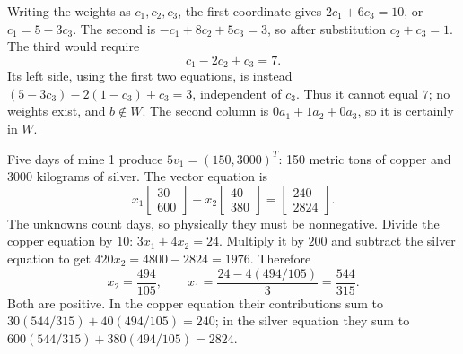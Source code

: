 Writing the weights as $c_1,c_2,c_3$, the first coordinate gives
$2c_1+6c_3=10$, or $c_1=5-3c_3$.
The second is $-c_1+8c_2+5c_3=3$, so after substitution
$c_2+c_3=1$. The third would require
\[
c_1-2c_2+c_3=7.
\]
Its left side, using the first two equations, is instead
$(5-3c_3)-2(1-c_3)+c_3=3$, independent of $c_3$.
Thus it cannot equal $7$; no weights exist, and $b\notin W$.
The second column is $0a_1+1a_2+0a_3$, so it is certainly in $W$.

Five days of mine 1 produce $5v_1=(150,3000)^T$: 150 metric tons
of copper and 3000 kilograms of silver.
The vector equation is
\[
x_1\begin{bmatrix}30\\600\end{bmatrix}
+x_2\begin{bmatrix}40\\380\end{bmatrix}
=\begin{bmatrix}240\\2824\end{bmatrix}.
\]
The unknowns count days, so physically they must be nonnegative.
Divide the copper equation by $10$: $3x_1+4x_2=24$.
Multiply it by $200$ and subtract the silver equation to get
$420x_2=4800-2824=1976$. Therefore
\[
x_2=\frac{494}{105},\qquad
x_1=\frac{24-4(494/105)}3=\frac{544}{315}.
\]
Both are positive. In the copper equation their contributions sum to
$30(544/315)+40(494/105)=240$; in the silver equation they sum
to $600(544/315)+380(494/105)=2824$.

